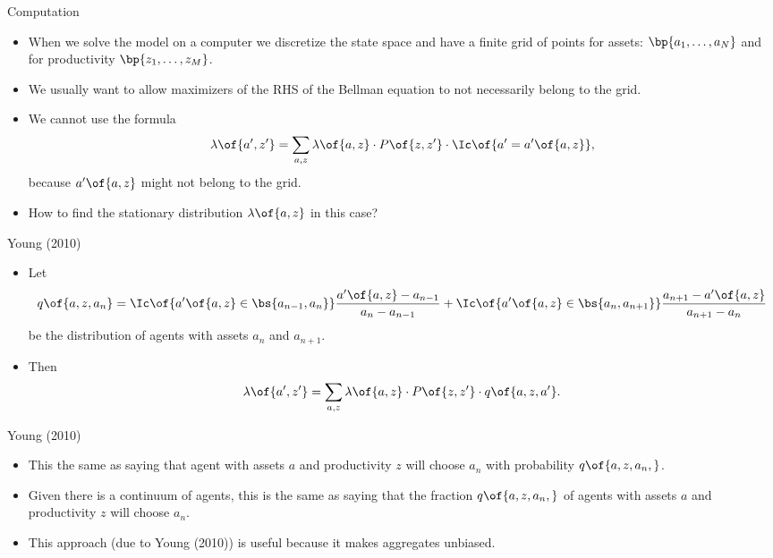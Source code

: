 \documentclass[11pt,xcolor={dvipsnames},aspectratio=159,hyperref={pdftex,pdfpagemode=UseNone,hidelinks,pdfdisplaydoctitle=true},usepdftitle=false]{beamer}
\begin{document}
\begin{frame}{Computation}   
    \begin{itemize}
        \item When we solve the model on a computer we discretize the state space and have a finite grid of points for assets: $\bp{a_1,\dots,a_N}$ and for productivity $\bp{z_1,\dots,z_M}$.
        \item We usually want to allow maximizers of the RHS of the Bellman equation to not necessarily belong to the grid.
        \item We cannot use the formula \begin{align*}
            \lambda\of{a^\prime,z^\prime} = \sum_{a,z} \lambda\of{a,z} \cdot P\of{z,z^\prime} \cdot \Ic\of{a^\prime = a^\prime\of{a,z}} , \end{align*}
            because $a^\prime\of{a,z}$ might not belong to the grid.
            \item How to find the stationary distribution $\lambda\of{a,z}$ in this case?
        \end{itemize}
    \end{frame}

\begin{frame}{Young (2010)}  
    \begin{itemize}

        \item Let \begin{align*}
            q\of{a,z,a_n}=\Ic\of{a^\prime\of{a,z}\in\bs{a_{n-1},a_n}} \frac{a^\prime\of{a,z}-a_{n-1}}{a_n - a_{n-1}} +  \Ic\of{a^\prime\of{a,z}\in\bs{a_{n},a_{n+1}}}  \frac{a_{n+1} - a^\prime\of{a,z}}{a_{n+1} - a_{n}}
        \end{align*}  be the distribution of agents with assets $a_n$ and $a_{n+1}$.
        \item Then 
        \begin{align*}
            \lambda\of{a^\prime,z^\prime} = \sum_{a,z} \lambda\of{a,z} \cdot P\of{z,z^\prime} \cdot q\of{a,z,a^\prime}.
        \end{align*}

    \end{itemize}
    \end{frame}
    
    
\begin{frame}{Young (2010)}   
    \begin{itemize}
        \item This the same as saying that agent with assets $a$ and productivity $z$ will choose $a_n$ with probability $q\of{a,z,a_n,}$.
        \item Given there is a continuum of agents, this is the same as saying that the fraction $q\of{a,z,a_n,}$ of agents with assets $a$ and productivity $z$ will choose $a_n$. 
        \item This approach (due to Young (2010)) is useful because it makes aggregates unbiased.
    \end{itemize}
    \end{frame}
            
\end{document}
